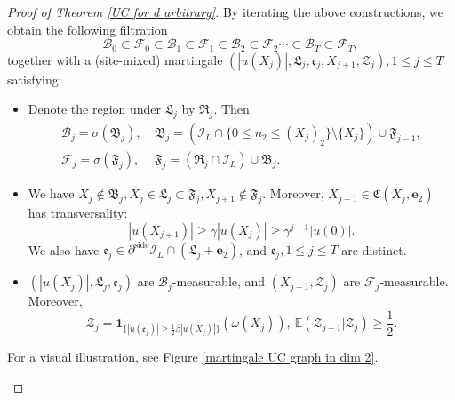 \documentclass[11pt,reqno,UTF8,twoside]{amsart}
\newcommand{\E}{\mathbb{E}}
\newcommand{\bfe}{\mathbf{e}}
\newcommand{\mcB}{\mathcal{B}}
\newcommand{\mcF}{\mathcal{F}}
\newcommand{\mcI}{\mathcal{I}}
\newcommand{\mcZ}{\mathcal{Z}}
\newcommand{\partialside}{\partial^{\text{side}}}
\theoremstyle{definition}
\numberwithin{equation}{section}
\begin{document}
\begin{proof}[Proof of Theorem \ref{UC for d arbitrary}]
By iterating the above constructions, we obtain the following filtration
\[\mcB_0\subset \mcF_0\subset \mcB_1\subset\mcF_1\subset  \mcB_2\subset\mcF_2\cdots \subset  \mcB_T \subset \mcF_T,\]
together with a (site-mixed) martingale $(|u(X_j)|,\mathfrak{L}_j,\mathfrak{e}_j, X_{j+1},\mcZ_j),1 \leq j\leq T$ satisfying:
\begin{itemize}
  \item Denote the region under $\mathfrak{L}_j$ by $\mathfrak{R}_j$. Then 
   \begin{align*}
    \mcB_j=\sigma\left( \mathfrak{B}_j \right),& \ \mathfrak{B}_j =(\mcI_L\cap \{0\leq n_2\leq (X_j)_2\} \setminus \{X_j\})\cup \mathfrak{F}_{j-1}  ,\\
      \mcF_j=\sigma(\mathfrak{F}_j),& \ \mathfrak{F}_j = (\mathfrak{R}_j\cap \mcI_L )\cup \mathfrak{B}_j.
  \end{align*}
  \item We have $X_j\notin \mathfrak{B}_j,X_{j}\in \mathfrak{L}_j\subset \mathfrak{F}_j,X_{j+1}\notin \mathfrak{F}_j$. Moreover, $X_{j+1}\in \mathfrak{C}(X_j,\bfe_2)$ has  transversality:  
  \[|u(X_{j+1})|\geq \gamma|u(X_j)|\geq \gamma^{j+1}|u(0)|.\]
  We also have $\mathfrak{e}_j\in \partialside \mcI_L \cap (\mathfrak{L}_j+\bfe_2)$,  and $\mathfrak{e}_j,1\leq j\leq T$ are distinct.
  \item $(|u(X_j)|,\mathfrak{L}_j,\mathfrak{e}_j)$ are $\mcB_j$-measurable,  and $ (X_{j+1},\mcZ_j)$ are $\mcF_j$-measurable. Moreover, 
        \[ \mcZ_j= \mathbf{1}_{\{|u(\mathfrak{e}_j)| \geq \frac{1}{2}\beta |u(X_j)|\} }(\omega(X_j)),\ \E(\mcZ_{j+1}| \mcZ_j)\geq \frac{1}{2}. \]
\end{itemize}
For a visual illustration, see Figure \ref{martingale UC graph in dim 2}.



\begin{figure}[htbp] 


  \centering 



  


\begin{tikzpicture}[x=0.75pt,y=0.75pt,yscale=-0.87,xscale=0.87]


\end{tikzpicture}
\end{figure}
\end{proof}
\end{document}

